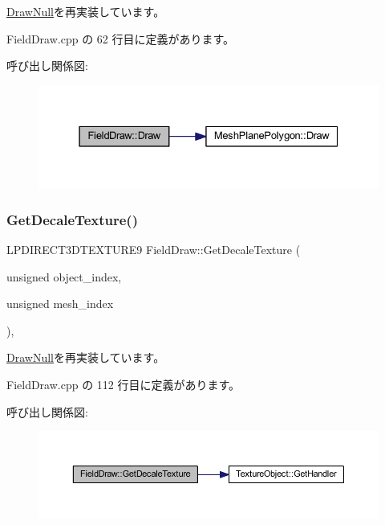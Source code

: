 \mbox{\hyperlink{class_draw_null_afe50f6fd820b18d673f70f048743f339}{Draw\+Null}}を再実装しています。



 Field\+Draw.\+cpp の 62 行目に定義があります。

呼び出し関係図\+:\nopagebreak
\begin{figure}[H]
\begin{center}
\leavevmode
\includegraphics[width=331pt]{class_field_draw_a1915497654d079074dbd3e058db06a78_cgraph}
\end{center}
\end{figure}
\mbox{\label{class_field_draw_a67eabcc5ffd6697b87e89a1c4ddb95f6}} 
\subsubsection{\texorpdfstring{Get\+Decale\+Texture()}{GetDecaleTexture()}}
{\footnotesize\ttfamily L\+P\+D\+I\+R\+E\+C\+T3\+D\+T\+E\+X\+T\+U\+R\+E9 Field\+Draw\+::\+Get\+Decale\+Texture (\begin{DoxyParamCaption}\item[{unsigned}]{object\+\_\+index,  }\item[{unsigned}]{mesh\+\_\+index }\end{DoxyParamCaption})\hspace{0.3cm}{\ttfamily [override]}, {\ttfamily [virtual]}}



\mbox{\hyperlink{class_draw_null_a8496ed1b1f765a331a8f1704122b8ca4}{Draw\+Null}}を再実装しています。



 Field\+Draw.\+cpp の 112 行目に定義があります。

呼び出し関係図\+:\nopagebreak
\begin{figure}[H]
\begin{center}
\leavevmode
\includegraphics[width=350pt]{class_field_draw_a67eabcc5ffd6697b87e89a1c4ddb95f6_cgraph}
\end{center}
\end{figure}
\mbox{\label{class_field_draw_ab126f938895211ff170bc37045a8e7a2}} 
